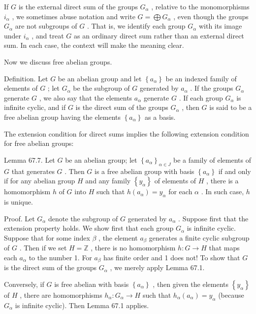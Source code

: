 \documentclass[10pt]{article}
\begin{document}
If \(G\) is the external direct sum of the groups \({G}_{\alpha }\) , relative to the monomorphisms \({i}_{\alpha }\) , we sometimes abuse notation and write \(G = \bigoplus {G}_{\alpha }\) , even though the groups \({G}_{\alpha }\) are not subgroups of \(G\) . That is, we identify each group \({G}_{\alpha }\) with its image under \({i}_{\alpha }\) , and treat \(G\) as an ordinary direct sum rather than an external direct sum. In each case, the context will make the meaning clear.

Now we discuss free abelian groups.

Definition. Let \(G\) be an abelian group and let \(\left\{  {a}_{\alpha }\right\}\) be an indexed family of elements of \(G\) ; let \({G}_{\alpha }\) be the subgroup of \(G\) generated by \({a}_{\alpha }\) . If the groups \({G}_{\alpha }\) generate \(G\) , we also say that the elements \({a}_{\alpha }\) generate \(G\) . If each group \({G}_{\alpha }\) is infinite cyclic, and if \(G\) is the direct sum of the groups \({G}_{\alpha }\) , then \(G\) is said to be a free abelian group having the elements \(\left\{  {a}_{\alpha }\right\}\) as a basis.

The extension condition for direct sums implies the following extension condition for free abelian groups:

Lemma 67.7. Let \(G\) be an abelian group; let \({\left\{  {a}_{\alpha }\right\}  }_{\alpha  \in  J}\) be a family of elements of \(G\) that generates \(G\) . Then \(G\) is a free abelian group with basis \(\left\{  {a}_{\alpha }\right\}\) if and only if for any abelian group \(H\) and any family \(\left\{  {y}_{\alpha }\right\}\) of elements of \(H\) , there is a homomorphism \(h\) of \(G\) into \(H\) such that \(h\left( {a}_{\alpha }\right)  = {y}_{\alpha }\) for each \(\alpha\) . In such case, \(h\) is unique.

Proof. Let \({G}_{\alpha }\) denote the subgroup of \(G\) generated by \({a}_{\alpha }\) . Suppose first that the extension property holds. We show first that each group \({G}_{\alpha }\) is infinite cyclic. Suppose that for some index \(\beta\) , the element \({a}_{\beta }\) generates a finite cyclic subgroup of \(G\) . Then if we set \(H = \mathbb{Z}\) , there is no homomorphism \(h : G \rightarrow  H\) that maps each \({a}_{\alpha }\) to the number 1. For \({a}_{\beta }\) has finite order and 1 does not! To show that \(G\) is the direct sum of the groups \({G}_{\alpha }\) , we merely apply Lemma 67.1.

Conversely, if \(G\) is free abelian with basis \(\left\{  {a}_{\alpha }\right\}\) , then given the elements \(\left\{  {y}_{\alpha }\right\}\) of \(H\) , there are homomorphisms \({h}_{\alpha } : {G}_{\alpha } \rightarrow  H\) such that \({h}_{\alpha }\left( {a}_{\alpha }\right)  = {y}_{\alpha }\) (because \({G}_{\alpha }\) is infinite cyclic). Then Lemma 67.1 applies.
\end{document}
